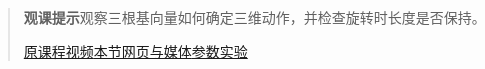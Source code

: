 \begin{quote}\small\textbf{观课提示}\quad 观察三根基向量如何确定三维动作，并检查旋转时长度是否保持。

\href{https://www.youtube.com/watch?v=rHLEWRxRGiM}{原课程视频}\quad\href{https://vitael04213.github.io/3blue1brown-notes/lessons/3d-transformations.html}{本节网页与媒体}\quad\href{https://vitael04213.github.io/3blue1brown-notes/lab.html\#spatial}{参数实验}
\end{quote}
